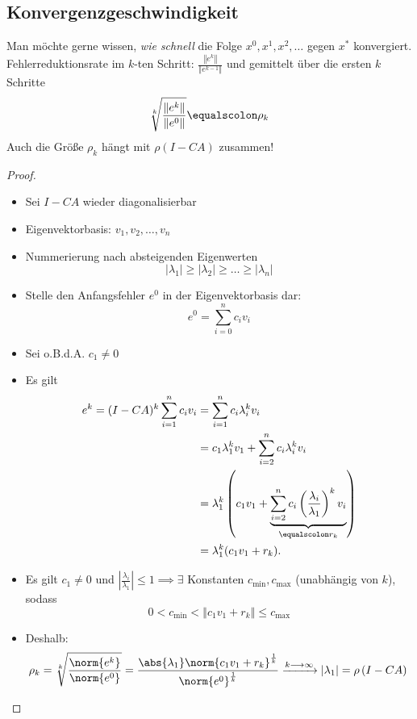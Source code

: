 \subsection{Konvergenzgeschwindigkeit}

Man möchte gerne wissen, \emph{wie schnell} die Folge $x^0,x^1,x^2,\ldots$ gegen $x^*$ konvergiert. Fehlerreduktionsrate im $k$-ten Schritt: $\frac{\left\Vert e^k \right\Vert}{\left\Vert e^{k-1} \right\Vert}$ und gemittelt über die ersten $k$ Schritte
\begin{equation*}
 \sqrt[k]{\frac{\left\Vert e^k \right\Vert}{\left\Vert e^0 \right\Vert}}\equalscolon \rho_k
\end{equation*}
Auch die Größe $\rho_k$ hängt mit $\rho(I-CA)$ zusammen!
\begin{proof}\mbox{}
\begin{itemize}
 \item Sei $I-CA$ wieder diagonalisierbar
 \item Eigenvektorbasis: $v_1,v_2,\ldots,v_n$
 \item Nummerierung nach absteigenden Eigenwerten
 \begin{equation*}
  \left\vert \lambda_1 \right\vert \geq \left\vert \lambda_2 \right\vert \geq \ldots \geq \left\vert \lambda_n \right\vert
 \end{equation*}
	\item Stelle den Anfangsfehler $e^0$ in der Eigenvektorbasis dar: \begin{equation*}
			e^0=\sum_{i=0}^n c_i v_i
		\end{equation*}
	\item Sei o.B.d.A. $c_1 \neq 0$
	\item Es gilt \begin{align*}
			e^k=(I-CA)^k \sum_{i=1}^n c_iv_i & =\sum_{i=1}^n c_i \lambda_i^k v_i \\
			& =c_1 \lambda_1^k v_1+\sum_{i=2}^n c_i \lambda_i^k v_i \\
			& =\lambda_1^k \left(c_1v_1+\underbrace{\sum_{i=2}^n c_i \left(\frac{\lambda_i}{\lambda_1} \right)^k v_i}_{\equalscolon r_k} \right) \\
			& = \lambda_1^k (c_1 v_1 + r_k).
		\end{align*}
	\item Es gilt $c_1 \neq 0$ und $\left\vert \frac{\lambda_i}{\lambda_1} \right\vert \leq 1 \implies \exists$ Konstanten $c_{\min},c_{\max}$ (unabhängig von $k$), sodass \begin{equation*}
			0<c_{\min}<\left\Vert c_1v_1+r_k \right\Vert \leq c_{\max}
		\end{equation*}
 \item Deshalb:
  \begin{equation*}
   \rho_k = \sqrt[k]{\frac{\norm{e^k}}{\norm{e^0}}}
    =
   \frac{\abs{\lambda_1} \norm{c_1v_1+r_k}^{\frac{1}{k}}}{\norm{e^0}^{\frac{1}{k}}} \xrightarrow[]{k \longrightarrow \infty} \left\vert \lambda_1 \right\vert =\rho \left(I-CA \right) \qedhere
 \end{equation*}
\end{itemize}
\end{proof}

